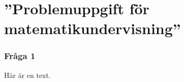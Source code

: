 \part{''Problemuppgift för matematikundervisning''}


\setcounter{section}{0}
\section{Fråga 1}
Här är en text.
